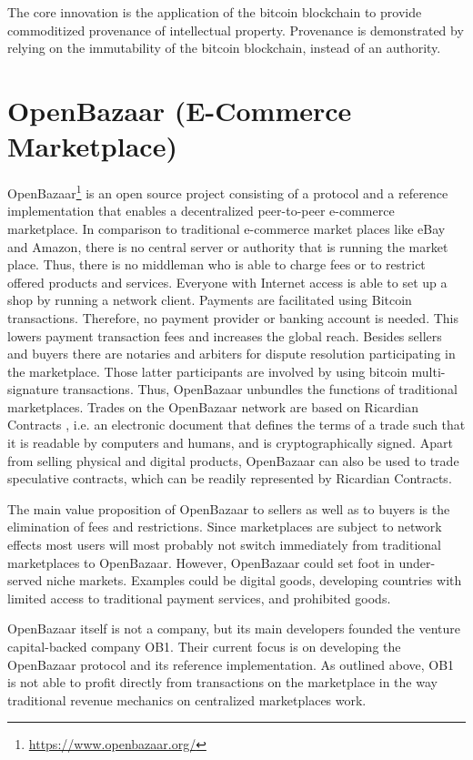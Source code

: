 The core innovation is the application of the bitcoin blockchain to provide commoditized 
provenance of intellectual property. Provenance is demonstrated by relying on the 
immutability of the bitcoin blockchain, instead of an authority. 

\section{OpenBazaar (E-Commerce Marketplace)}
\label{sec:ecobazaar}

OpenBazaar\footnote{\url{https://www.openbazaar.org/}} is an open source project consisting of a protocol and a reference 
implementation that enables a decentralized peer-to-peer e-commerce marketplace. 
In comparison to traditional e-commerce market places like eBay and Amazon, there 
is no central server or authority that is running the market place. Thus, there 
is no middleman who is able to charge fees or to restrict offered products and 
services. Everyone with Internet access is able to set up a shop by running a network 
client. Payments are facilitated using Bitcoin transactions. Therefore, no payment 
provider or banking account is needed. This lowers payment transaction fees and 
increases the global reach. Besides sellers and buyers there are notaries and arbiters 
for dispute resolution participating in the marketplace. Those latter participants 
are involved by using bitcoin multi-signature transactions. Thus, OpenBazaar unbundles 
the functions of traditional marketplaces. Trades on the OpenBazaar network are 
based on Ricardian Contracts \parencite{1319505}, i.e. an electronic document that defines 
the terms of a trade such that it is readable by computers and humans, and is cryptographically 
signed. Apart from selling physical and digital products, OpenBazaar can also be 
used to trade speculative contracts, which can be readily represented by Ricardian 
Contracts. 

The main value proposition of OpenBazaar to sellers as well as to buyers is the 
elimination of fees and restrictions. Since marketplaces are subject to network 
effects most users will most probably not switch immediately from traditional marketplaces 
to OpenBazaar. However, OpenBazaar could set foot in under-served niche markets. 
Examples could be digital goods, developing countries with limited access to traditional 
payment services, and prohibited goods. 

OpenBazaar itself is not a company, but its main developers founded the venture 
capital-backed company OB1. Their current focus is on developing the OpenBazaar 
protocol and its reference implementation. As outlined above, OB1 is not able to 
profit directly from transactions on the marketplace in the way traditional revenue 
mechanics on centralized marketplaces work. 

